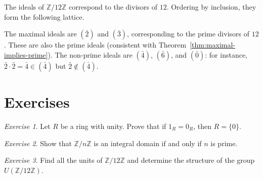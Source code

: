\documentclass[12pt,a4paper,openany]{book}
\theoremstyle{definition}
\theoremstyle{remark}
\newtheorem{exercise}{Exercise}[chapter]
\begin{document}
The ideals of $\mathbb{Z}/12\mathbb{Z}$ correspond to the divisors of $12$. Ordering by inclusion, they form the following lattice.

\begin{center}
\end{center}

The maximal ideals are $(\bar{2})$ and $(\bar{3})$, corresponding to the prime divisors of $12$. These are also the prime ideals (consistent with Theorem~\ref{thm:maximal-implies-prime}). The non-prime ideals are $(\bar{4})$, $(\bar{6})$, and $(\bar{0})$: for instance, $\bar{2}\cdot\bar{2}=\bar{4}\in(\bar{4})$ but $\bar{2}\notin(\bar{4})$.

\section{Exercises}\label{sec:ring-exercises}

\begin{exercise}\label{exo:ring-1}
Let $R$ be a ring with unity. Prove that if $1_R=0_R$, then $R=\{0\}$.
\end{exercise}

\begin{exercise}\label{exo:ring-2}
Show that $\mathbb{Z}/n\mathbb{Z}$ is an integral domain if and only if $n$ is prime.
\end{exercise}

\begin{exercise}\label{exo:ring-3}
Find all the units of $\mathbb{Z}/12\mathbb{Z}$ and determine the structure of the group $U(\mathbb{Z}/12\mathbb{Z})$.
\end{exercise}
\end{document}

